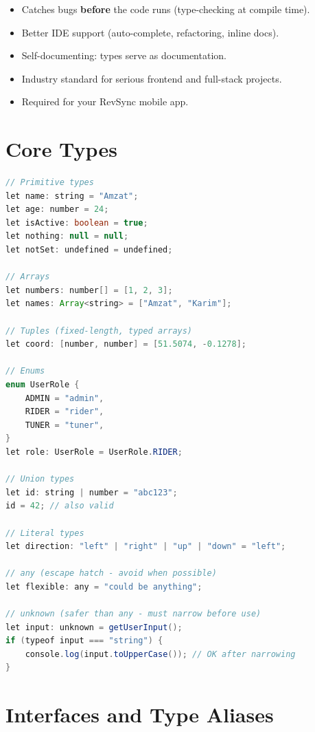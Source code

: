 \documentclass[12pt, a4paper, oneside]{book}
\begin{document}
\begin{itemize}[leftmargin=2em]
    \item Catches bugs \textbf{before} the code runs (type-checking at compile time).
    \item Better IDE support (auto-complete, refactoring, inline docs).
    \item Self-documenting: types serve as documentation.
    \item Industry standard for serious frontend and full-stack projects.
    \item Required for your RevSync mobile app.
\end{itemize}

\section{Core Types}

\begin{lstlisting}[language=Java, caption={TypeScript basic types}]
// Primitive types
let name: string = "Amzat";
let age: number = 24;
let isActive: boolean = true;
let nothing: null = null;
let notSet: undefined = undefined;

// Arrays
let numbers: number[] = [1, 2, 3];
let names: Array<string> = ["Amzat", "Karim"];

// Tuples (fixed-length, typed arrays)
let coord: [number, number] = [51.5074, -0.1278];

// Enums
enum UserRole {
    ADMIN = "admin",
    RIDER = "rider",
    TUNER = "tuner",
}
let role: UserRole = UserRole.RIDER;

// Union types
let id: string | number = "abc123";
id = 42; // also valid

// Literal types
let direction: "left" | "right" | "up" | "down" = "left";

// any (escape hatch - avoid when possible)
let flexible: any = "could be anything";

// unknown (safer than any - must narrow before use)
let input: unknown = getUserInput();
if (typeof input === "string") {
    console.log(input.toUpperCase()); // OK after narrowing
}
\end{lstlisting}

\section{Interfaces and Type Aliases}
\end{document}
